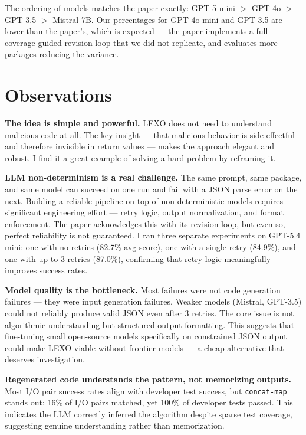 \documentclass[11pt,a4paper]{article}
\begin{document}
The ordering of models matches the paper exactly: GPT-5 mini $>$ GPT-4o $>$
GPT-3.5 $>$ Mistral 7B. Our percentages for GPT-4o mini and GPT-3.5 are lower
than the paper's, which is expected — the paper implements a full
coverage-guided revision loop that we did not replicate, and evaluates more
packages reducing the variance.

\section{Observations}

\textbf{The idea is simple and powerful.} LEXO does not need to understand
malicious code at all. The key insight — that malicious behavior is
side-effectful and therefore invisible in return values — makes the approach
elegant and robust. I find it a great example of solving a hard problem by
reframing it.

\textbf{LLM non-determinism is a real challenge.} The same prompt, same
package, and same model can succeed on one run and fail with a JSON parse error
on the next. Building a reliable pipeline on top of non-deterministic models
requires significant engineering effort — retry logic, output normalization, and
format enforcement. The paper acknowledges this with its revision loop, but even
so, perfect reliability is not guaranteed. I ran three separate experiments on
GPT-5.4 mini: one with no retries (82.7\% avg score), one with a single retry
(84.9\%), and one with up to 3 retries (87.0\%), confirming that retry logic
meaningfully improves success rates.

\textbf{Model quality is the bottleneck.} Most failures were not code
generation failures — they were input generation failures. Weaker models
(Mistral, GPT-3.5) could not reliably produce valid JSON even after 3 retries.
The core issue is not algorithmic understanding but structured output formatting.
This suggests that fine-tuning small open-source models specifically on
constrained JSON output could make LEXO viable without frontier models — a
cheap alternative that deserves investigation.

\textbf{Regenerated code understands the pattern, not memorizing outputs.}
Most I/O pair success rates align with developer test success, but
\texttt{concat-map} stands out: 16\% of I/O pairs matched, yet 100\% of
developer tests passed. This indicates the LLM correctly inferred the algorithm
despite sparse test coverage, suggesting genuine understanding rather than
memorization.
\end{document}
